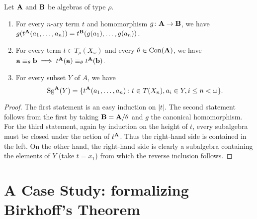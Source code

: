 \documentclass[12pt]{amsart}  %
\begin{document}
\begin{theorem} 
  \label{thm:4.32} 
Let $\mathbf{A}$ and $\mathbf{B}$ be algebras of type $\rho$.
\begin{enumerate}
  \item
    For every $n$-ary term $t$ and homomorphism $g\colon \mathbf{A} \to \mathbf{B}$, 
    we have 
    $g(t^{\mathbf{A}}(a_1,\dots, a_n)) = t^{\mathbf{B}}(g(a_1),\dots, g(a_n))$.
  \item
    For every term $t \in T_\rho(X_\omega)$ and every $\theta \in \operatorname{Con}(\mathbf{A})$, we have
    $\mathbf{a} \equiv_\theta \mathbf{b} \implies t^{\mathbf{A}}(\mathbf{a}) \equiv_\theta t^{\mathbf{A}}(\mathbf{b})$.
  \item
    For every subset $Y$ of $A$, we have
    \[\operatorname{Sg}^{\mathbf{A}}(Y) = 
    \{ t^{\mathbf{A}}(a_1,\dots, a_n) : t \in T(X_n), a_i \in Y, i \leq n < \omega\}.\]
\end{enumerate}
\end{theorem}
\begin{proof} 
  The first statement is an easy induction on $|t|$. 
  The second statement follows from the first by taking $\mathbf{B} = \mathbf{A}/\theta$ 
  and $g$ the canonical homomorphism. For the third statement, again by induction on the 
  height of $t$, every subalgebra must be closed under the action of $t^{\mathbf{A}}$. 
  Thus the right-hand side is contained in the left. On the other hand, the right-hand 
  side is clearly a subalgebra containing the elements of $Y$ (take $t = x_1$) from 
  which the reverse inclusion follows.
\end{proof}


\section{A Case Study: formalizing Birkhoff's Theorem}
\end{document}
